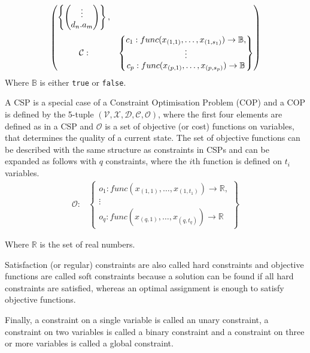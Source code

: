 \begin{align}
\begin{pmatrix}
\begin{Bmatrix}
\begin{pmatrix}
			\vdots\\
			d_n.a_m\\
		\end{pmatrix}
	\end{Bmatrix},\vspace{6pt}\\
	\mathcal{C}:&
	\begin{Bmatrix}
		c_1: func(x_{(1,1)}, \ldots,x_{(1,s_1)}) \rightarrow \mathbb{B},\\
		\vdots\\
		c_p: func(x_{(p,1)}, \ldots,x_{(p,s_p)}) \rightarrow \mathbb{B}
	\end{Bmatrix}
\end{pmatrix}
\label{eq:problem_spec}
\end{align}
Where $\mathbb{B}$ is either \texttt{true} or \texttt{false}.

A CSP is a special case of a Constraint Optimisation Problem (COP) and a COP is defined by the 5-tuple $(\mathcal{V}, \mathcal{X}, \mathcal{D}, \mathcal{C}, \mathcal{O})$, where the first four elements are defined as in a CSP and $\mathcal{O}$ is a set of objective (or cost) functions on variables, that determines the quality of a current state. The set of objective functions can be described with the same structure as constraints in CSPs and can be expanded as follows with $q$ constraints, where the $i$th function is defined on $t_i$ variables.
\begin{align}
	\mathcal{O}:&
	\begin{Bmatrix}
		o_1: func(x_{(1,1)}, \ldots,x_{(1,t_1)}) \rightarrow \mathbb{R},\\
		\vdots\\
		o_q: func(x_{(q,1)}, \ldots,x_{(q,t_q)}) \rightarrow \mathbb{R}
	\end{Bmatrix}
	\label{eq:objective}
\end{align}

Where $\mathbb{R}$ is the set of real numbers.

Satisfaction (or regular) constraints are also called hard constraints and objective functions are called soft constraints because a solution can be found if all hard constraints are satisfied, whereas an optimal assignment is enough to satisfy objective functions.

Finally, a constraint on a single variable is called an unary constraint, a constraint on two variables is called a binary constraint and a constraint on three or more variables is called a global constraint.

